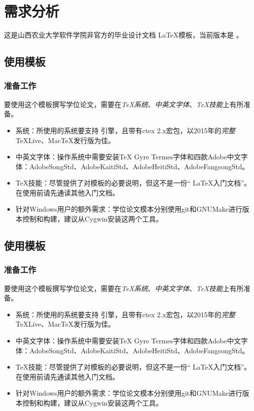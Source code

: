 \chapter{需求分析}
\label{chap:intro}

这是山西农业大学软件学院非官方的毕业设计文档 \LaTeX 模板，当前版本是 \version 。

\section{使用模板}

\subsection{准备工作}
\label{sec:requirements}

要使用这个模板撰写学位论文，需要在\emph{TeX系统}、\emph{中英文字体}、\emph{TeX技能}上有所准备。

\begin{itemize}[noitemsep,topsep=0pt,parsep=0pt,partopsep=0pt]
	\item 系统：所使用的系统要支持 引擎，且带有ctex 2.x宏包，以2015年的\emph{完整}TeXLive、MacTeX发行版为佳。
	\item 中英文字体：操作系统中需要安装TeX Gyre Termes字体和四款Adobe中文字体：AdobeSongStd、AdobeKaitiStd、AdobeHeitiStd、AdobeFangsongStd。
	\item TeX技能：尽管提供了对模板的必要说明，但这不是一份“ \LaTeX 入门文档”。在使用前请先通读其他入门文档。
	\item 针对Windows用户的额外需求：学位论文模本分别使用git和GNUMake进行版本控制和构建，建议从Cygwin安装这两个工具。
\end{itemize}

\section{使用模板}

\subsection{准备工作}
\label{sec:requirements}

要使用这个模板撰写学位论文，需要在\emph{TeX系统}、\emph{中英文字体}、\emph{TeX技能}上有所准备。

\begin{itemize}[noitemsep,topsep=0pt,parsep=0pt,partopsep=0pt]
	\item 系统：所使用的系统要支持 引擎，且带有ctex 2.x宏包，以2015年的\emph{完整}TeXLive、MacTeX发行版为佳。
	\item 中英文字体：操作系统中需要安装TeX Gyre Termes字体和四款Adobe中文字体：AdobeSongStd、AdobeKaitiStd、AdobeHeitiStd、AdobeFangsongStd。
	\item TeX技能：尽管提供了对模板的必要说明，但这不是一份“ \LaTeX 入门文档”。在使用前请先通读其他入门文档。
	\item 针对Windows用户的额外需求：学位论文模本分别使用git和GNUMake进行版本控制和构建，建议从Cygwin安装这两个工具。
\end{itemize}

